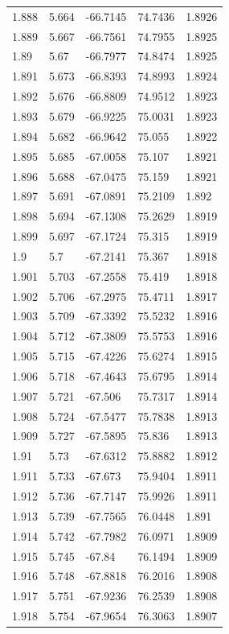 \begin{tabular}{lllll}
1.888 & 5.664 & -66.7145 & 74.7436 & 1.8926 \\
1.889 & 5.667 & -66.7561 & 74.7955 & 1.8925 \\
1.89 & 5.67 & -66.7977 & 74.8474 & 1.8925 \\
1.891 & 5.673 & -66.8393 & 74.8993 & 1.8924 \\
1.892 & 5.676 & -66.8809 & 74.9512 & 1.8923 \\
1.893 & 5.679 & -66.9225 & 75.0031 & 1.8923 \\
1.894 & 5.682 & -66.9642 & 75.055 & 1.8922 \\
1.895 & 5.685 & -67.0058 & 75.107 & 1.8921 \\
1.896 & 5.688 & -67.0475 & 75.159 & 1.8921 \\
1.897 & 5.691 & -67.0891 & 75.2109 & 1.892 \\
1.898 & 5.694 & -67.1308 & 75.2629 & 1.8919 \\
1.899 & 5.697 & -67.1724 & 75.315 & 1.8919 \\
1.9 & 5.7 & -67.2141 & 75.367 & 1.8918 \\
1.901 & 5.703 & -67.2558 & 75.419 & 1.8918 \\
1.902 & 5.706 & -67.2975 & 75.4711 & 1.8917 \\
1.903 & 5.709 & -67.3392 & 75.5232 & 1.8916 \\
1.904 & 5.712 & -67.3809 & 75.5753 & 1.8916 \\
1.905 & 5.715 & -67.4226 & 75.6274 & 1.8915 \\
1.906 & 5.718 & -67.4643 & 75.6795 & 1.8914 \\
1.907 & 5.721 & -67.506 & 75.7317 & 1.8914 \\
1.908 & 5.724 & -67.5477 & 75.7838 & 1.8913 \\
1.909 & 5.727 & -67.5895 & 75.836 & 1.8913 \\
1.91 & 5.73 & -67.6312 & 75.8882 & 1.8912 \\
1.911 & 5.733 & -67.673 & 75.9404 & 1.8911 \\
1.912 & 5.736 & -67.7147 & 75.9926 & 1.8911 \\
1.913 & 5.739 & -67.7565 & 76.0448 & 1.891 \\
1.914 & 5.742 & -67.7982 & 76.0971 & 1.8909 \\
1.915 & 5.745 & -67.84 & 76.1494 & 1.8909 \\
1.916 & 5.748 & -67.8818 & 76.2016 & 1.8908 \\
1.917 & 5.751 & -67.9236 & 76.2539 & 1.8908 \\
1.918 & 5.754 & -67.9654 & 76.3063 & 1.8907 \\

\end{tabular}

